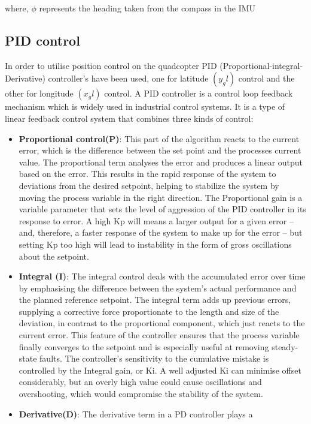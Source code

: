 \documentclass{report}
\begin{document}
where, \(\phi\) represents the heading taken from the compass in the IMU

\subsection{PID control}\label{PID_control} In order to utilise position
control on the quadcopter PID (Proportional-integral-Derivative) controller's
have been used, one for latitude \((y_gl)\) control and the other for longitude \((x_gl)\) control. A
PID controller is a control loop feedback mechanism which is widely used in
industrial control systems. It is a type of linear feedback control system that
combines three kinds of control:
\begin{itemize}
  \item \textbf{Proportional control(P)}: This part of the algorithm reacts to
  the current error, which is the difference between the set point and the
  processes current value. The proportional term analyses the error and produces
  a linear output based on the error. This results in the rapid response of the
  system to deviations from the desired setpoint, helping to stabilize the
  system by moving the process variable in the right direction. The Proportional
  gain is a variable parameter that sets the level of aggression of the PID
  controller in its response to error. A high Kp will means a larger output for
  a given error – and, therefore, a faster response of the system to make up for
  the error – but setting Kp too high will lead to instability in the form of
  gross oscillations about the setpoint.
  \item \textbf{Integral (I)}: The integral control deals with the accumulated
  error over time by emphasising the difference between the system's actual
  performance and the planned reference setpoint. The integral term adds up
  previous errors, supplying a corrective force proportionate to the length and
  size of the deviation, in contrast to the proportional component, which just
  reacts to the current error. This feature of the controller ensures that the
  process variable finally converges to the setpoint and is especially useful at
  removing steady-state faults. The controller's sensitivity to the cumulative
  mistake is controlled by the Integral gain, or Ki. A well adjusted Ki can
  minimise offset considerably, but an overly high value could cause
  oscillations and overshooting, which would compromise the stability of the
  system.
  \item \textbf{Derivative(D)}: The derivative term in a PD controller plays a

\end{itemize}
\end{document}
